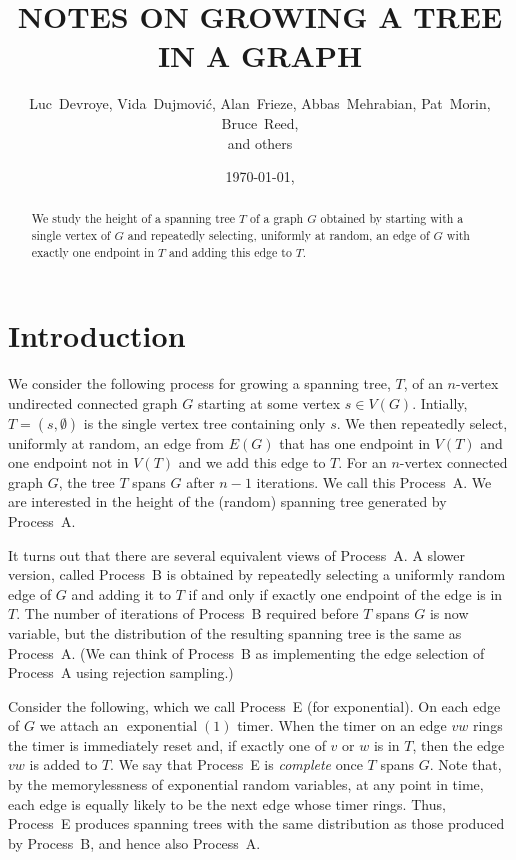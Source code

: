 \documentclass{patmorin}
\date{\today, \currenttime}
\title{\MakeUppercase{Notes on Growing a Tree in a Graph}}
\author{
   Luc~Devroye,
   Vida~Dujmovi\'c,
   Alan~Frieze,
   Abbas~Mehrabian,
   Pat~Morin,
   Bruce~Reed,\\
   and others
}
\DeclareMathOperator{\exponential}{exponential}
\begin{document}
\maketitle

\begin{abstract}
We study the height of a spanning tree $T$ of a graph $G$ obtained by
starting with a single vertex of $G$ and repeatedly selecting, uniformly
at random, an edge of $G$ with exactly one endpoint in $T$ and adding
this edge to $T$.
\end{abstract}

\tableofcontents
\newpage

\section{Introduction}

We consider the following process for growing a spanning tree, $T$, of an
$n$-vertex undirected connected graph $G$ starting at some vertex $s\in
V(G)$. Intially, $T=(s,\emptyset)$ is the single vertex tree containing
only $s$. We then repeatedly select, uniformly at random, an edge from
$E(G)$ that has one endpoint in $V(T)$ and one endpoint not in $V(T)$
and we add this edge to $T$.  For an $n$-vertex connected graph $G$,
the tree $T$ spans $G$ after $n-1$ iterations.  We call this Process~A.
We are interested in the height of the (random) spanning tree generated
by Process~A.

It turns out that there are several equivalent views of Process~A.
A slower version, called Process~B is obtained by repeatedly selecting
a uniformly random edge of $G$ and adding it to $T$ if and only if
exactly one endpoint of the edge is in $T$.  The number of iterations
of Process~B required before $T$ spans $G$ is now variable, but the
distribution of the resulting spanning tree is the same as Process~A.
(We can think of Process~B as implementing the edge selection of Process~A
using rejection sampling.)

Consider the following, which we call Process~E (for exponential).
On each edge of $G$ we attach an $\exponential(1)$ timer.  When the
timer on an edge $vw$ rings the timer is immediately reset and, if
exactly one of $v$ or $w$ is in $T$, then the edge $vw$ is added to $T$.
We say that Process~E is \emph{complete} once $T$ spans $G$.  Note that,
by the memorylessness of exponential random variables, at any point in
time, each edge is equally likely to be the next edge whose timer rings.
Thus, Process~E produces spanning trees with the same distribution as
those produced by Process~B, and hence also Process~A.
\end{document}
